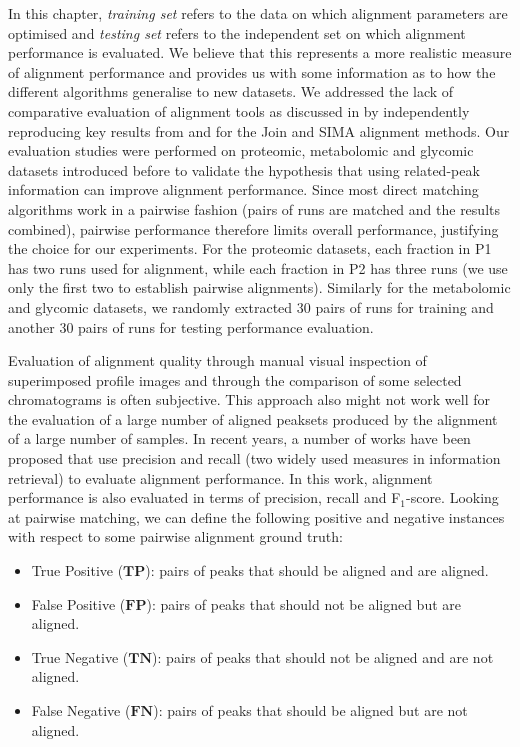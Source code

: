 In this chapter, \emph{training set} refers to the data on which alignment parameters are optimised and \emph{testing set} refers to the independent set on which alignment performance is evaluated. We believe that this represents a more realistic measure of alignment performance and provides us with some information as to how the different algorithms generalise to new datasets. We addressed the lack of comparative evaluation of alignment tools as discussed in \cite{Smith2013} by independently reproducing key results from \cite{Lange2008} and \cite{Voss2011a} for the Join and SIMA alignment methods. Our evaluation studies were performed on proteomic, metabolomic and glycomic datasets introduced before to validate the hypothesis that using related-peak information can improve alignment performance. Since most direct matching algorithms work in a pairwise fashion (pairs of runs are matched and the results combined), pairwise performance therefore limits overall performance, justifying the choice for our experiments. For the proteomic datasets, each fraction in P1 has two runs used for alignment, while each fraction in P2 has three runs (we use only the first two to establish pairwise alignments). Similarly for the metabolomic and glycomic datasets, we randomly extracted 30 pairs of runs for training and another 30 pairs of runs for testing performance evaluation.

Evaluation of alignment quality through manual visual inspection of superimposed profile images and through the comparison of some selected chromatograms is often subjective. This approach also might not work well for the evaluation of a large number of aligned peaksets produced by the alignment of a large number of samples. In recent years, a number of works \cite{Lange2008, Ballardini2011, Voss2011a, Tsai2013a} have been proposed that use precision and recall (two widely used measures in information retrieval) to evaluate alignment performance. In this work, alignment performance is also evaluated in terms of precision, recall and F$_1$-score. Looking at pairwise matching, we can define the following positive and negative instances with respect to some pairwise alignment ground truth:

\begin{itemize}
\item True Positive ($\boldsymbol{TP}$): pairs of peaks that should be aligned and are aligned.
\item False Positive ($\boldsymbol{FP}$): pairs of peaks that should not be aligned but are aligned.
\item True Negative ($\boldsymbol{TN}$): pairs of peaks that should not be aligned and are not aligned.
\item False Negative ($\boldsymbol{FN}$): pairs of peaks that should be aligned but are not aligned.
\end{itemize}


